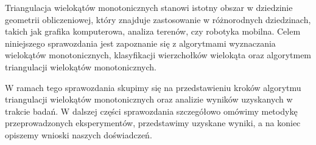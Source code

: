 \quad Triangulacja wielokątów monotonicznych stanowi istotny obszar w dziedzinie geometrii obliczeniowej, który znajduje zastosowanie w różnorodnych dziedzinach, takich jak grafika komputerowa, analiza terenów, czy robotyka mobilna. 
Celem niniejszego sprawozdania jest zapoznanie się z algorytmami wyznaczania wielokątów monotonicznych, klasyfikacji wierzchołków wielokąta oraz algorytmem triangulacji wielokątów monotonicznych.

W ramach tego sprawozdania skupimy się na przedstawieniu kroków algorytmu triangulacji wielokątów monotonicznych oraz analizie wyników uzyskanych w trakcie badań. 
W dalszej części sprawozdania szczegółowo omówimy metodykę przeprowadzonych eksperymentów, przedstawimy uzyskane wyniki, a na koniec opiszemy wnioski naszych doświadczeń.